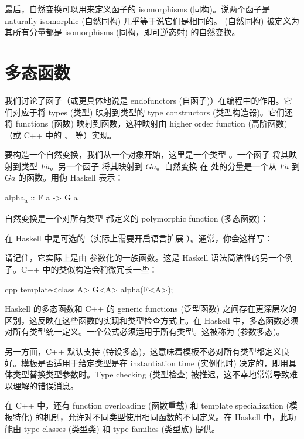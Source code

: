 最后，自然变换可以用来定义函子的 isomorphisms (同构)。说两个函子是 naturally isomorphic (自然同构) 几乎等于说它们是相同的。 (自然同构) 被定义为其所有分量都是 isomorphisms (同构，即可逆态射) 的自然变换。

\section{多态函数}

我们讨论了函子（或更具体地说是 endofunctors (自函子)）在编程中的作用。它们对应于将 types (类型) 映射到类型的 type constructors (类型构造器)。它们还将 functions (函数) 映射到函数，这种映射由 higher order function (高阶函数) （或 C++ 中的 、 等）实现。

要构造一个自然变换，我们从一个对象开始，这里是一个类型 。一个函子  将其映射到类型 $F a$。另一个函子  将其映射到 $G a$。自然变换  在  处的分量是一个从 $F a$ 到 $G a$ 的函数。用伪 Haskell 表示：

\begin{snipv}
alpha\textsubscript{a} :: F a -> G a
\end{snipv}
自然变换是一个对所有类型  都定义的 polymorphic function (多态函数)：

 在 Haskell 中是可选的（实际上需要开启语言扩展 ）。通常，你会这样写：

请记住，它实际上是由  参数化的一族函数。这是 Haskell 语法简洁性的另一个例子。C++ 中的类似构造会稍微冗长一些：

\begin{snip}{cpp}
template<class A> G<A> alpha(F<A>);
\end{snip}
Haskell 的多态函数和 C++ 的 generic functions (泛型函数) 之间存在更深层次的区别，这反映在这些函数的实现和类型检查方式上。在 Haskell 中，多态函数必须对所有类型统一定义。一个公式必须适用于所有类型。这被称为  (参数多态)。

另一方面，C++ 默认支持  (特设多态)，这意味着模板不必对所有类型都定义良好。模板是否适用于给定类型是在 instantiation time (实例化时) 决定的，即用具体类型替换类型参数时。Type checking (类型检查) 被推迟，这不幸地常常导致难以理解的错误消息。

在 C++ 中，还有 function overloading (函数重载) 和 template specialization (模板特化) 的机制，允许对不同类型使用相同函数的不同定义。在 Haskell 中，此功能由 type classes (类型类) 和 type families (类型族) 提供。


